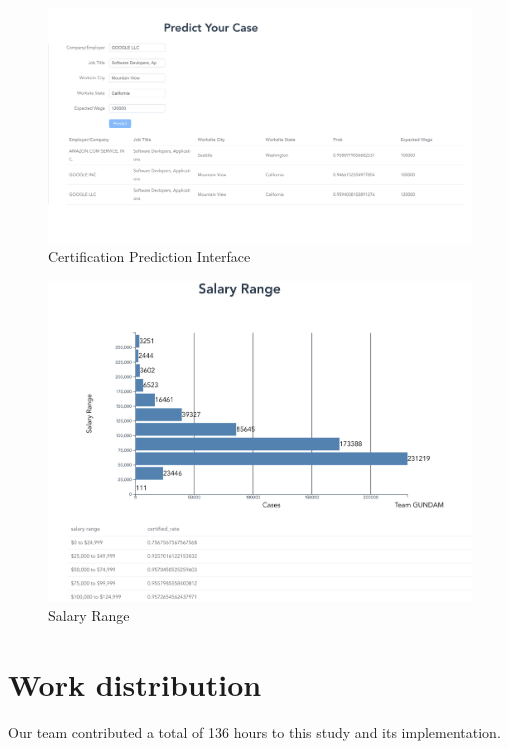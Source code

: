 \documentclass[sigconf]{acmart}
\begin{document}
\begin{figure}
  \includegraphics[width=\linewidth]{predict.png}
  \caption{Certification Prediction Interface}
  \label{fig:predict}
\end{figure}

\begin{figure}
  \includegraphics[width=\linewidth]{salary_range.png}
  \caption{Salary Range}
  \label{fig:salaryrange}
\end{figure}

\appendix

\section{Work distribution}

Our team contributed a total of 136 hours to this study and its implementation. 
\end{document}
